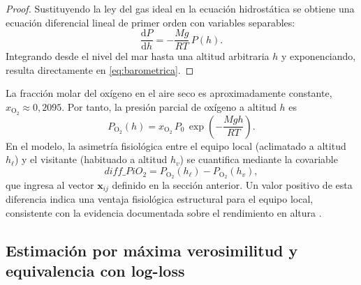 \begin{proof}
	Sustituyendo la ley del gas ideal en la ecuaci\'on hidrost\'atica se obtiene una ecuaci\'on diferencial lineal de primer orden con variables separables:
	\[
	\frac{\mathrm{d}P}{\mathrm{d}h} = -\frac{Mg}{RT}\,P(h).
	\]
	Integrando desde el nivel del mar hasta una altitud arbitraria $h$ y exponenciando, resulta directamente en \eqref{eq:barometrica}.
\end{proof}

La fracci\'on molar del ox\'igeno en el aire seco es aproximadamente constante, $x_{\mathrm{O}_2} \approx 0{,}2095$. Por tanto, la presi\'on parcial de ox\'igeno a altitud $h$ es
\begin{equation}\label{eq:pio2}
	P_{\mathrm{O}_2}(h) = x_{\mathrm{O}_2}\,P_0\,\exp\!\left(-\frac{Mgh}{RT}\right).
\end{equation}
En el modelo, la asimetr\'ia fisiol\'ogica entre el equipo local (aclimatado a altitud $h_{\ell}$) y el visitante (habituado a altitud $h_v$) se cuantifica mediante la covariable
\begin{equation}\label{eq:diff_pio2}
	\mathit{diff\_PiO_2} = P_{\mathrm{O}_2}(h_{\ell}) - P_{\mathrm{O}_2}(h_v),
\end{equation}
que ingresa al vector $\mathbf{x}_{ij}$ definido en la secci\'on anterior. Un valor positivo de esta diferencia indica una ventaja fisiol\'ogica estructural para el equipo local, consistente con la evidencia documentada sobre el rendimiento en altura \cite{West1996}.

\subsection{Estimaci\'on por m\'axima verosimilitud y equivalencia con log-loss}
\label{subsec:logloss}

